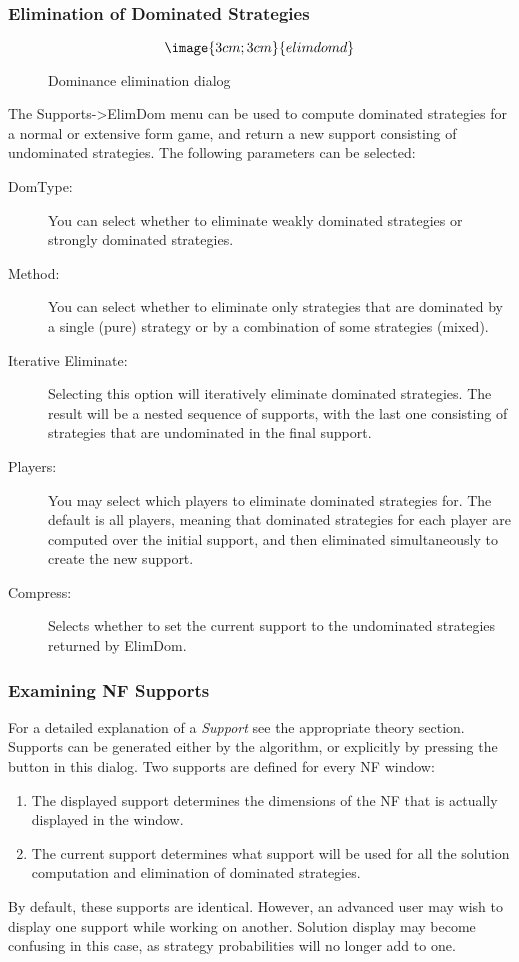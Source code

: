 \subsubsection{Elimination of Dominated Strategies}\label{ElimDom}
\begin{figure}
$$\image{3cm;3cm}{elimdomd}$$
\caption{Dominance elimination dialog}\label{fig_elimdomd}
\end{figure}

The Supports->ElimDom menu can be used to compute dominated 
strategies for a normal or extensive form game, and return a new support 
consisting of undominated strategies.  
The following parameters can 
be selected:
\begin{description}
\item[DomType:]  You can select whether to eliminate weakly dominated 
strategies or strongly dominated strategies.
\item[Method:] You can select whether to eliminate only strategies that are
dominated by a single (pure) strategy or by a combination of some strategies
(mixed).
\item[Iterative Eliminate:] Selecting this option will iteratively eliminate dominated strategies. The 
result will be a nested sequence of supports, with the last one consisting of 
strategies that are undominated in the final support.  
\item[Players:] You may select which players to eliminate dominated strategies for. The 
default is all players, meaning that dominated strategies for each player are computed 
over the initial support, and then eliminated simultaneously to create the new support.  
\item[Compress:] Selects whether to set the current support to the undominated 
strategies returned by ElimDom.  
\end{description}

\subsubsection{Examining NF Supports}\label{ElimDomInspect}
For a detailed explanation of a {\em Support} see the appropriate theory section.
Supports can be generated either by the 
  algorithm, 
or explicitly by pressing the  button 
in this dialog.  Two supports are defined for every NF window:
\begin{enumerate}
\item The displayed support determines the dimensions of the NF that is actually
displayed in the window.
\item The current support determines what support will be used for all the solution
computation and elimination of dominated strategies. 
\end{enumerate}
By default, these supports are identical.  However, an advanced user may wish to
display one support while working on another.  Solution display may become 
confusing in this case, as strategy probabilities will no longer add to one.  

